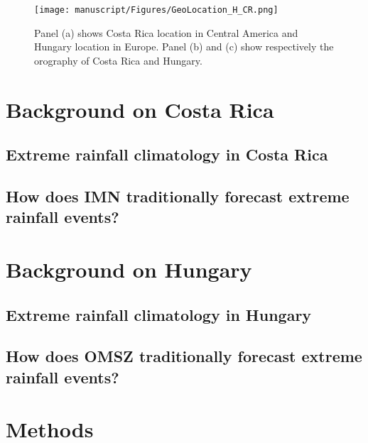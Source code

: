 \documentclass[twocol]{ametsocV5} %
\begin{document}

\begin{figure}
\centerline{\texttt{[image: manuscript/Figures/GeoLocation\_H\_CR.png]}}
\caption{Panel (a) shows Costa Rica location in Central America and Hungary location in Europe. Panel (b) and (c) show respectively the orography of Costa Rica and Hungary.}
\label{GeoLocation_H_CR}
\end{figure}

\section{Background on Costa Rica}
\subsection{Extreme rainfall climatology in Costa Rica}
\subsection{How does IMN traditionally forecast extreme rainfall events?}

\section{Background on Hungary}
\subsection{Extreme rainfall climatology in Hungary}
\subsection{How does OMSZ traditionally forecast extreme rainfall events?}




\section{Methods} 
\end{document}
